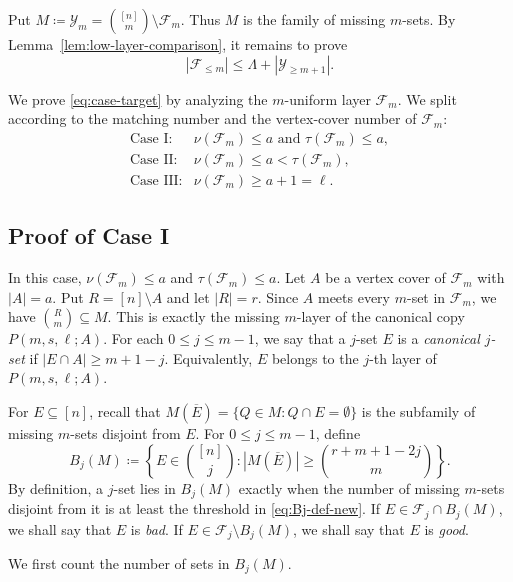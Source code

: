 \documentclass[10pt,a4paper]{article}
\numberwithin{equation}{section}
\theoremstyle{definition}
\newcommand{\F}{\mathcal F}
\newcommand{\Y}{\mathcal Y}
\begin{document}
Put \(M \coloneqq \Y_m=\binom{[n]}m\setminus \F_m.\)
Thus $M$ is the family of missing $m$-sets.
By Lemma~\ref{lem:low-layer-comparison}, it remains to prove
\begin{equation}\label{eq:case-target}
    |\F_{\le m}|\le \Lambda+|\Y_{\ge m+1}|.
\end{equation}

We prove \eqref{eq:case-target} by analyzing the \(m\)-uniform layer
\(\F_m\).
We split according to the matching number and the vertex-cover number of $\F_m$:
\[
    \begin{array}{ll}
        \text{Case I:}   & \nu(\F_m)\le a\text{ and }\tau(\F_m)\le a, \\[1mm]
        \text{Case II:}  & \nu(\F_m)\le a<\tau(\F_m),                 \\[1mm]
        \text{Case III:} & \nu(\F_m)\ge a+1=\ell.
    \end{array}
\]



\subsection{Proof of Case I}
In this case, $\nu(\F_m)\le a$ and $\tau(\F_m)\le a$.
Let $A$ be a vertex cover of $\F_m$ with $|A|=a$.
Put $R=[n]\setminus A$ and let $|R|=r$.
Since $A$ meets every $m$-set in $\F_m$, we have $\binom Rm\subseteq M$.
This is exactly the missing $m$-layer of the canonical copy
$P(m,s,\ell;A)$.
For each $0\le j\le m-1$, we say that a $j$-set $E$ is a \emph{canonical
    $j$-set} if
\(|E\cap A|\ge m+1-j.\)
Equivalently, $E$ belongs to the $j$-th layer of $P(m,s,\ell;A)$.

For $E\subseteq[n]$, recall that $M(\overline E)=\{Q\in M:Q\cap E=\emptyset\}$ is the subfamily of missing $m$-sets disjoint from $E$.
For $0\le j\le m-1$, define
\begin{equation}\label{eq:Bj-def-new}
    B_j(M) \coloneqq
    \left\{E\in\binom{[n]}j:
    |M(\overline E)|\ge\binom{r+m+1-2j}{m}
    \right\}.
\end{equation}
By definition, a \(j\)-set lies in \(B_j(M)\) exactly when the number of missing \(m\)-sets disjoint from it is at least the threshold in
\eqref{eq:Bj-def-new}.
If $E\in\F_j\cap B_j(M)$, we shall say that $E$ is \emph{bad}.
If
$E\in\F_j\setminus B_j(M)$, we shall say that $E$ is \emph{good}.


We first count the number of sets in $B_j(M)$.
\end{document}

